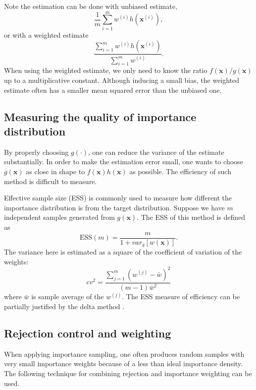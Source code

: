 \documentclass[times, utf8, diplomski]{fer}
\begin{document}
Note the estimation can be done with unbiased estimate,
\begin{equation}
\frac{1}{m}\sum_{i=1}^{m}w^{(i)}h(\mathbf{x}^{(i)}),
\end{equation}
or with a weighted estimate
\begin{equation}
\frac{\sum_{i=1}^{m}w^{(i)}h(\mathbf{x}^{(i)})}{ \sum_{i=1}^{m}w^{(i)}}.
\label{wei_est}
\end{equation}
When using the weighted estimate, we only need to know the ratio $f(\mathbf{x})/g(\mathbf{x})$ up to a multiplicative constant. Although inducing a small bias, the weighted estimate often has a smaller mean squared error than the unbiased one.

\subsection{Measuring the quality of importance distribution}
By properly choosing $g(\cdot)$, one can reduce the variance of the estimate substantially. In order to make the estimation error small, one wants to choose $g(\mathbf{x})$ as close in shape to $f(\mathbf{x})h(\mathbf{x})$ as possible. The efficiency of such method is difficult to measure. 

Effective sample size (ESS) is commonly used to measure how different the importance distribution is from the target  distribution. %
Suppose we have $m$ independent samples generated from $g(\mathbf{x})$. The ESS of this method is defined as 
\begin{equation}
\text{ESS}(m) = \frac{m}{1 + var_g[w(\mathbf{x})]}.
\end{equation}  
The variance here is estimated as a square of the coefficient of variation of the weights:
\begin{equation}
cv^2 = \frac{\sum_{j=1}^{m} (w^{(j)} - \bar{w})^2}{(m - 1)\bar{w}^2}
\end{equation}
where $\bar{w}$ is sample average of the $w^{(j)}$. The ESS measure of efficiency can be partially justified by the delta method \cite{Liu}. %

\subsection{Rejection control and weighting}
When applying importance sampling, one often produces random samples with very small importance weights because of a less than ideal importance density. The following technique for combining rejection and importance weighting can be used. 
\end{document}
